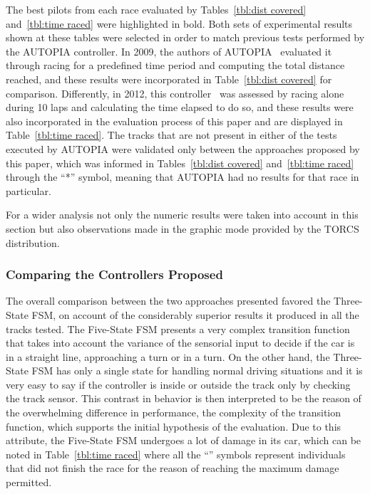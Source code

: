 	The best pilots from each race evaluated by Tables~\ref{tbl:dist covered} and~\ref{tbl:time raced} were highlighted in bold. Both sets of experimental results shown at these tables were selected in order to match previous tests performed by the AUTOPIA controller. In 2009, the authors of AUTOPIA~\cite{AUTOPIA2009} evaluated it through racing for a predefined time period and computing the total distance reached, and these results were incorporated in Table~\ref{tbl:dist covered} for comparison. Differently, in 2012, this controller~\cite{AUTOPIA} was assessed by racing alone during 10 laps and calculating the time elapsed to do so, and these results were also incorporated in the evaluation process of this paper and are displayed in Table~\ref{tbl:time raced}. The tracks that are not present in either of the tests executed by AUTOPIA were validated only between the approaches proposed by this paper, which was informed in Tables~\ref{tbl:dist covered} and~\ref{tbl:time raced} through the ``*'' symbol, meaning that AUTOPIA had no results for that race in particular.
	
	For a wider analysis not only the numeric results were taken into account in this section but also observations made in the graphic mode provided by the TORCS distribution.
\subsubsection{Comparing the Controllers Proposed} \label{subsubsec:CompControllers}
	
	The overall comparison between the two approaches presented favored the Three-State FSM, on account of the considerably superior results it produced in all the tracks tested. The Five-State FSM presents a very complex transition function that takes into account the variance of the sensorial input to decide if the car is in a straight line, approaching a turn or in a turn. On the other hand, the Three-State FSM has only a single state for handling normal driving situations and it is very easy to say if the controller is inside or outside the track only by checking the track sensor. This contrast in behavior is then interpreted to be the reason of the overwhelming difference in performance, the complexity of the transition function, which supports the initial hypothesis of the evaluation. Due to this attribute, the Five-State FSM undergoes a lot of damage in its car, which can be noted in Table~\ref{tbl:time raced} where all the ``\textdagger'' symbols represent individuals that did not finish the race for the reason of reaching the maximum damage permitted.
	
